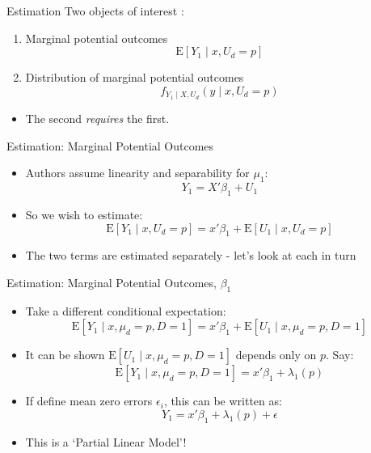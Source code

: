 \documentclass{beamer}
\begin{document}
\begin{frame}{Estimation}
  Two objects of interest :
\begin{enumerate}
\item Marginal potential outcomes
\begin{equation*}
  \mathrm{E}[Y_1\mid x,U_d=p]
\end{equation*}
\item Distribution of marginal potential outcomes
  \begin{equation*}
    f_{Y_1\mid X,U_d}(y\mid x,U_d=p)
  \end{equation*}
\end{enumerate}
\begin{itemize}
\item The second \textit{requires} the first.
\end{itemize}

\end{frame}


\begin{frame}{Estimation: Marginal Potential Outcomes  }
  \begin{itemize}
  \item Authors assume linearity and separability for $\mu_1$:
    \begin{equation*}
      Y_1  = X'\beta_1 +  U_1
    \end{equation*}
\item So we wish to estimate:
    \begin{equation*}
      \mathrm{E}[Y_1\mid x,U_d=p]  = x'\beta_1 +  \mathrm{E}[U_1\mid x,U_d=p]
    \end{equation*}
\item The two terms are estimated separately - let's look at each in turn
  \end{itemize}
\end{frame}

\begin{frame}{Estimation:  Marginal Potential Outcomes, $\beta_1$}
  \begin{itemize}
\item Take a different conditional expectation:
\begin{equation*}
  \mathrm{E}[Y_1\mid x, \mu_d=p,D=1] = x'\beta_1 +  \mathrm{E}[U_1\mid x,\mu_d=p,
  D=1   ]
\end{equation*}
\item It can be shown $\mathrm{E}[U_1\mid x,\mu_d=p,
  D=1   ]$ depends only on $p$. Say:
  \begin{equation*}
    \mathrm{E}[Y_1\mid x, \mu_d=p,D=1] = x'\beta_1 +  \lambda_1(p)
  \end{equation*}
\item If define mean zero errors $\epsilon_i$, this can be written as:
 \begin{equation*}
    Y_1 = x'\beta_1 +  \lambda_1(p) + \epsilon
  \end{equation*}
\item This is a `Partial Linear Model'!
\end{itemize}
\end{frame}
\end{document}
